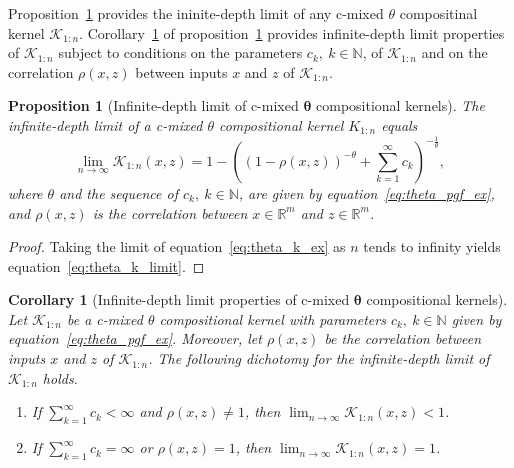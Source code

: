 \documentclass[final, 12pt]{colt2021} %
\newtheorem{prop}{Proposition}
\newtheorem{corol}{Corollary}
\begin{document}
Proposition~\ref{prop:varying_theta_kernel_limit}
provides the ininite-depth limit of any
c-mixed $\theta$ compositinal kernel $\mathcal{K}_{1:n}$.
Corollary~\ref{cor:varying_theta_kernel_limit} of
proposition~\ref{prop:varying_theta_kernel_limit}
provides infinite-depth limit properties of
$\mathcal{K}_{1:n}$
subject to conditions on the parameters $c_k,~k\in\mathbb{N}$,
of $\mathcal{K}_{1:n}$ and on the correlation
$\rho (x, z)$ between inputs $x$ and $z$ of $\mathcal{K}_{1:n}$.

\begin{prop}[Infinite-depth limit of c-mixed $\boldsymbol{\theta}$ compositional kernels]
\label{prop:varying_theta_kernel_limit}
The infinite-depth limit of a
c-mixed $\theta$ compositional kernel $K_{1:n}$ equals
\begin{equation}
\label{eq:theta_k_limit}
\lim_{n\rightarrow\infty}
\mathcal{K}_{1:n}(x,z) =
1 - \left((1 - \rho (x, z))^{-\theta} + \sum_{k = 1}^{\infty} c_{k} \right)^{-\frac{1}{\theta}},
\end{equation}
where
$\theta$ and the sequence of $c_{k},~k\in\mathbb{N}$, are given by
equation~\eqref{eq:theta_pgf_ex}, and
$\rho (x, z)$ is the correlation between
$x\in\mathbb{R}^m$ and $z\in\mathbb{R}^m$.

\end{prop}

\begin{proof}
Taking the limit of equation~\eqref{eq:theta_k_ex}
as $n$ tends to infinity
yields equation~\eqref{eq:theta_k_limit}.
\end{proof}

\begin{corol}[Infinite-depth limit properties of c-mixed $\boldsymbol{\theta}$ compositional kernels]
\label{cor:varying_theta_kernel_limit}
Let $\mathcal{K}_{1:n}$ be a c-mixed $\theta$ compositional kernel
with parameters $c_k,~k\in\mathbb{N}$ given by
equation~\eqref{eq:theta_pgf_ex}.
Moreover, let
$\rho (x, z)$ be the correlation
between inputs $x$ and $z$ of $\mathcal{K}_{1:n}$.
The following dichotomy for the infinite-depth limit of $\mathcal{K}_{1:n}$ holds.
\begin{enumerate}
\item If $\sum_{k = 1}^{\infty} c_{k} < \infty$ and $\rho (x, z) \ne 1$,
then $\lim_{n\rightarrow\infty}\mathcal{K}_{1:n}(x,z) < 1$.
\item If $\sum_{k = 1}^{\infty} c_{k} = \infty$ or $\rho (x, z) = 1$,
then $\lim_{n\rightarrow\infty}\mathcal{K}_{1:n}(x,z) = 1$.
\end{enumerate}
\end{corol}
\end{document}
